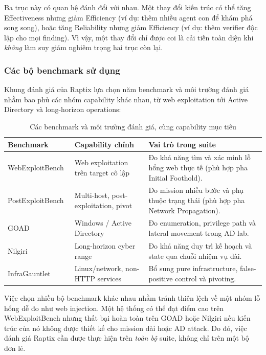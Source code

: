 Ba trục này có quan hệ đánh đổi với nhau. Một thay đổi kiến trúc có thể tăng Effectiveness nhưng giảm Efficiency (ví dụ: thêm nhiều agent con để khám phá song song), hoặc tăng Reliability nhưng giảm Efficiency (ví dụ: thêm verifier độc lập cho mọi finding). Vì vậy, một thay đổi chỉ được coi là cải tiến toàn diện khi \emph{không} làm suy giảm nghiêm trọng hai trục còn lại.

\subsubsection*{Các bộ benchmark sử dụng}

Khung đánh giá của Raptix lựa chọn năm benchmark và môi trường đánh giá nhằm bao phủ các nhóm capability khác nhau, từ web exploitation tới Active Directory và long-horizon operations:

\begin{table}[H]
\centering
\caption{Các benchmark và môi trường đánh giá, cùng capability mục tiêu}
\label{tab:benchmark-suite}
\small
\renewcommand{\arraystretch}{1.3}
\begin{tabular}{|p{3.4cm}|p{5.5cm}|p{6.5cm}|}
\hline
\textbf{Benchmark} & \textbf{Capability chính} & \textbf{Vai trò trong suite} \\
\hline
WebExploitBench~\cite{agentcyberrange} & Web exploitation trên target cô lập & Đo khả năng tìm và xác minh lỗ hổng web thực tế (phù hợp pha Initial Foothold). \\
\hline
PostExploitBench~\cite{agentcyberrange} & Multi-host, post-exploitation, pivot & Đo mission nhiều bước và phụ thuộc trạng thái (phù hợp pha Network Propagation). \\
\hline
GOAD~\cite{goad} & Windows / Active Directory & Đo enumeration, privilege path và lateral movement trong AD lab. \\
\hline
Nilgiri~\cite{nilgiri} & Long-horizon cyber range & Đo khả năng duy trì kế hoạch và state qua chuỗi nhiệm vụ dài. \\
\hline
InfraGauntlet~\cite{infragauntlet} & Linux/network, non-HTTP services & Bổ sung pure infrastructure, false-positive control và pivoting. \\
\hline
\end{tabular}
\end{table}

Việc chọn nhiều bộ benchmark khác nhau nhằm tránh thiên lệch về một nhóm lỗ hổng dễ đo như web injection. Một hệ thống có thể đạt điểm cao trên WebExploitBench nhưng thất bại hoàn toàn trên GOAD hoặc Nilgiri nếu kiến trúc của nó không được thiết kế cho mission dài hoặc AD attack. Do đó, việc đánh giá Raptix cần được thực hiện trên \emph{toàn bộ} suite, không chỉ trên một bộ đơn lẻ.

